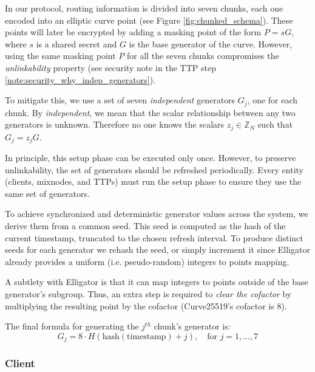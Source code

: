 In our protocol, routing information is divided into seven chunks, each one encoded into an elliptic curve point (see Figure \ref{fig:chunked_schema}). 
These points will later be encrypted by adding a masking point of the form $ P = s G $, where $ s $ is a shared secret and $ G $ is the base generator of the curve.
However, using the same masking point $ P $ for all the seven chunks compromises the \textit{unlinkability} property
(see security note in the TTP step \ref{note:security_why_indep_generators}).

To mitigate this, we use a set of seven \textit{independent} generators $ G_j $, one for each chunk. 
By \textit{independent}, we mean that the scalar relationship between any two generators is unknown. 
Therefore no one knows the scalars $ z_j \in \mathbb{Z}_N $ such that $ G_j = z_j G $.

In principle, this setup phase can be executed only once. 
However, to preserve unlinkability, the set of generators should be refreshed periodically. 
Every entity (clients, mixnodes, and TTPs) must run the setup phase to ensure they use the same set of generators.

To achieve synchronized and deterministic generator values across the system, we derive them from a common seed. 
This seed is computed as the hash of the current timestamp, truncated to the chosen refresh interval. 
To produce distinct seeds for each generator we rehash the seed, or simply increment it since Elligator already provides a uniform (i.e. pseudo-random) integers to points mapping.

A subtlety with Elligator is that it can map integers to points outside of the base generator's subgroup.
Thus, an extra step is required to \textit{clear the cofactor} by multiplying the resulting point by the cofactor (Curve25519's cofactor is $ 8 $).

\noindent The final formula for generating the $ j^{th} $ chunk’s generator is:
\begin{equation}
G_j = 8 \cdot H(\text{hash}(\text{timestamp}) + j), \quad \text{for } j = 1, \dots, 7
\end{equation}


\subsubsection{Client}
  
